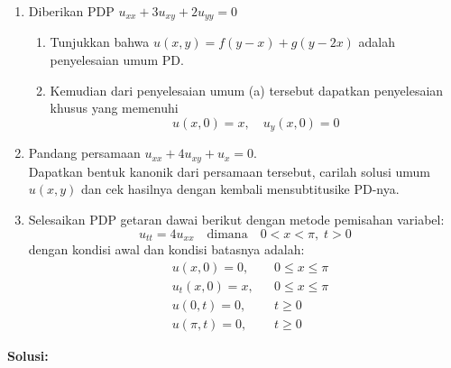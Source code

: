 \documentclass{article}
\theoremstyle{definition}
\begin{document}
\pagestyle{fancy}
\begin{enumerate}
  \item Diberikan PDP \( u_{xx} + 3u_{xy} + 2u_{yy} = 0 \)

\begin{enumerate}
    \item Tunjukkan bahwa \( u(x,y) = f(y - x) + g(y - 2x) \) adalah penyelesaian umum PD.
    \item Kemudian dari penyelesaian umum (a) tersebut dapatkan penyelesaian khusus yang memenuhi
    \[
    u(x,0) = x, \quad u_y(x,0) = 0
    \]
\end{enumerate}

\item Pandang persamaan \( u_{xx} + 4u_{xy} + u_x = 0 \). \\
Dapatkan bentuk kanonik dari persamaan tersebut, carilah solusi umum \( u(x,y) \) dan cek hasilnya dengan kembali mensubtitusike PD-nya.

\item Selesaikan PDP getaran dawai berikut dengan metode pemisahan variabel:
\[
u_{tt} = 4 u_{xx} \quad \text{dimana} \quad 0 < x < \pi,\; t > 0
\]
dengan kondisi awal dan kondisi batasnya adalah:
\[
\begin{aligned}
& u(x,0) = 0, && 0 \leq x \leq \pi \\
& u_t(x,0) = x, && 0 \leq x \leq \pi \\
& u(0,t) = 0, && t \geq 0 \\
& u(\pi,t) = 0, && t \geq 0
\end{aligned}
\]

\end{enumerate}
\textbf{Solusi:}
\end{document}
